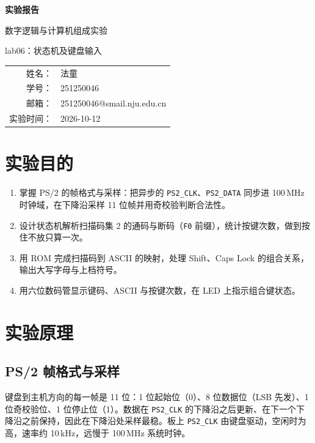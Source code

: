 \documentclass[12pt, a4paper]{ctexart}
\makeatletter
\newcommand{\coursename}{数字逻辑与计算机组成实验}
\newcommand{\expname}{lab06：状态机及键盘输入}
\newcommand{\expdate}{2026-10-12}
\newcommand{\stuname}{法童}
\newcommand{\stuid}{251250046}
\newcommand{\stumail}{251250046@smail.nju.edu.cn}
\makeatother
\begin{document}
\begin{titlepage}
    \centering
    \vspace*{4cm}
    {\Huge\bfseries 实验报告\par}
    \vspace{1.5cm}
    {\Large \coursename\par}
    \vspace{0.8cm}
    {\Large \expname\par}
    \vspace{3cm}
    {\large
    \begin{tabular}{rl}
        姓名： & \stuname \\
        学号： & \stuid \\
        邮箱： & \stumail \\
        实验时间： & \expdate \\
    \end{tabular}\par}
\end{titlepage}

\section{实验目的}
\begin{enumerate}
    \item 掌握 PS/2 的帧格式与采样：把异步的 \texttt{PS2\_CLK}、\texttt{PS2\_DATA} 同步进 100\,MHz 时钟域，在下降沿采样 11 位帧并用奇校验判断合法性。
    \item 设计状态机解析扫描码集 2 的通码与断码（\texttt{F0} 前缀），统计按键次数，做到按住不放只算一次。
    \item 用 ROM 完成扫描码到 ASCII 的映射，处理 Shift、Caps Lock 的组合关系，输出大写字母与上档符号。
    \item 用六位数码管显示键码、ASCII 与按键次数，在 LED 上指示组合键状态。
\end{enumerate}

\section{实验原理}

\subsection{PS/2 帧格式与采样}
键盘到主机方向的每一帧是 11 位：1 位起始位（0）、8 位数据位（LSB 先发）、1 位奇校验位、1 位停止位（1）。数据在 \texttt{PS2\_CLK} 的下降沿之后更新、在下一个下降沿之前保持，因此在下降沿处采样最稳。板上 \texttt{PS2\_CLK} 由键盘驱动，空闲时为高，速率约 10\,kHz，远慢于 100\,MHz 系统时钟。
\end{document}
